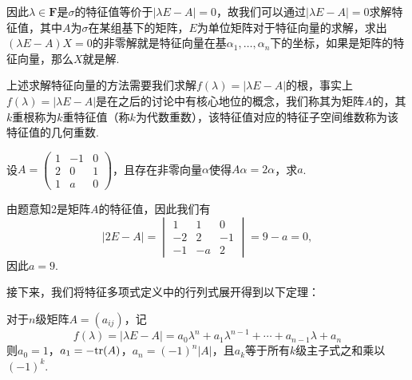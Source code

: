 因此$\lambda\in\mathbf{F}$是$\sigma$的特征值等价于$|\lambda E-A|=0$，故我们可以通过$|\lambda E-A|=0$求解特征值，其中$A$为$\sigma$在某组基下的矩阵，$E$为单位矩阵对于特征向量的求解，求出$(\lambda E-A)X=0$的非零解就是特征向量在基$\alpha_1,\ldots,\alpha_n$下的坐标，如果是矩阵的特征向量，那么$X$就是解.

上述求解特征向量的方法需要我们求解$f(\lambda)=|\lambda E-A|$的根，事实上$f(\lambda)=|\lambda E-A|$是在之后的讨论中有核心地位的概念，我们称其为矩阵$A$的，其$k$重根称为$k$重特征值（称$k$为代数重数），该特征值对应的特征子空间维数称为该特征值的几何重数.

\begin{example}
    设$A=\begin{pmatrix}
            1 & -1 & 0 \\ 2 & 0 & 1 \\ 1 & a & 0
        \end{pmatrix}$，且存在非零向量$\alpha$使得$A\alpha=2\alpha$，求$a$.
\end{example}

\begin{solution}
    由题意知2是矩阵$A$的特征值，因此我们有
    \[|2E-A|=\begin{vmatrix}
            1 & 1 & 0 \\ -2 & 2 & -1 \\ -1 & -a & 2
        \end{vmatrix}=9-a=0,\]
    因此$a=9$.
\end{solution}

接下来，我们将特征多项式定义中的行列式展开得到以下定理：
\begin{theorem}\label{thm:18:特征多项式展开}
    对于$n$级矩阵$A=(a_{ij})$，记
    \[f(\lambda)=|\lambda E-A|=a_0\lambda^n+a_1\lambda^{n-1}+\cdots+a_{n-1}\lambda+a_n\]
    则$a_0=1$，$a_1=-\textup{tr}(A)$，$a_n=(-1)^n|A|$，且$a_k$等于所有$k$级主子式之和乘以$(-1)^k$.
\end{theorem}


